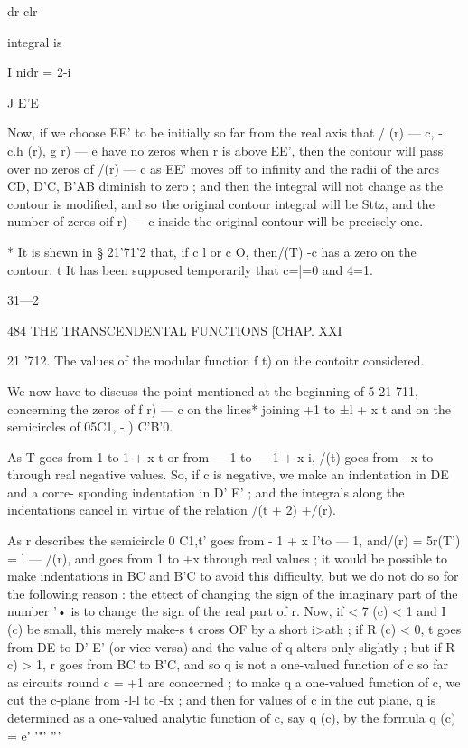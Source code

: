 dr clr 

integral is 



I nidr = 2-i 

J E'E 



Now, if we choose EE' to be initially so far from the real axis that / (r) — c,  - c.h (r), 
g  r) — e have no zeros when r is above EE', then the contour will pass over no zeros 
of /(r) — c as EE' moves off to infinity and the radii of the arcs CD, D'C, B'AB diminish 
to zero ; and then the integral will not change as the contour is modified, and so the 
original contour integral will be Sttz, and the number of zeros oif r) — c inside the original 
contour will be precisely one. 

* It is shewn in § 21'71'2 that, if c l or c O, then/(T) -c has a zero on the contour. 
t It has been supposed temporarily that c=|=0 and 4=1. 

31—2 



484 THE TRANSCENDENTAL FUNCTIONS [CHAP. XXI 

21 '712. The values of the modular function f  t) on the contoitr considered. 

We now have to discuss the point mentioned at the beginning of  5 21-711, concerning 
the zeros of f r) — c on the lines* joining +1 to ±l + x t and on the semicircles of 
05C1,  - ) C'B'0. 

As T goes from 1 to 1 + x t or from — 1 to — 1 + x i, /(t) goes from - x to through 
real negative values. So, if c is negative, we make an indentation in DE and a corre- 
sponding indentation in D' E' ; and the integrals along the indentations cancel in virtue of 
the relation /(t + 2) +/(r). 

As r describes the semicircle 0 C1,t' goes from - 1 + x I'to — 1, and/(r) = 5r(T') = l — /(r), 
and goes from 1 to +x through real values ; it would be possible to make indentations in 
BC and B'C to avoid this difficulty, but we do not do so for the following reason : the 
ettect of changing the sign of the imaginary part of the number '• is to change the sign of the 
real part of r. Now, if < 7  (c) < 1 and I (c) be small, this merely make-s t cross OF by a 
short i>ath ; if R (c) < 0, t goes from DE to D' E' (or vice versa) and the value of q alters 
only slightly ; but if R c) > 1, r goes from BC to B'C, and so q is not a one-valued function 
of c so far as circuits round c = +1 are concerned ; to make q a one-valued function of c, 
we cut the c-plane from -l-l to -fx ; and then for values of c in the cut plane, q is 
determined as a one-valued analytic function of c, say q (c), by the formula q (c) = e' '"' ''' 

